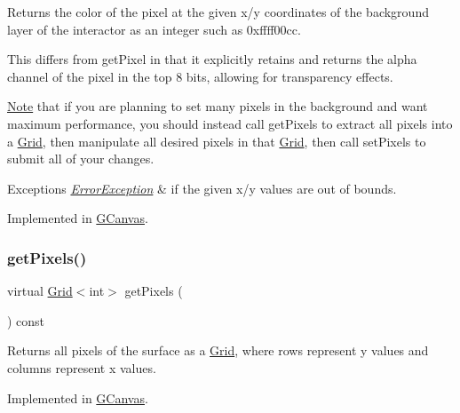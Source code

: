 Returns the color of the pixel at the given x/y coordinates of the background layer of the interactor as an integer such as 0xffff00cc. 

This differs from get\+Pixel in that it explicitly retains and returns the alpha channel of the pixel in the top 8 bits, allowing for transparency effects.

\mbox{\hyperlink{classNote}{Note}} that if you are planning to set many pixels in the background and want maximum performance, you should instead call get\+Pixels to extract all pixels into a \mbox{\hyperlink{classGrid}{Grid}}, then manipulate all desired pixels in that \mbox{\hyperlink{classGrid}{Grid}}, then call set\+Pixels to submit all of your changes.


\begin{DoxyExceptions}{Exceptions}
{\em \mbox{\hyperlink{classErrorException}{Error\+Exception}}} & if the given x/y values are out of bounds. \\
\hline
\end{DoxyExceptions}


Implemented in \mbox{\hyperlink{classGCanvas_ac1016456426446714a53d29da622f2ec}{G\+Canvas}}.

\mbox{\label{classGDrawingSurface_a9811240b1241922153dec17d395797cf}} 
\subsubsection{\texorpdfstring{get\+Pixels()}{getPixels()}}
{\footnotesize\ttfamily virtual \mbox{\hyperlink{classGrid}{Grid}}$<$int$>$ get\+Pixels (\begin{DoxyParamCaption}{ }\end{DoxyParamCaption}) const\hspace{0.3cm}{\ttfamily [pure virtual]}}



Returns all pixels of the surface as a \mbox{\hyperlink{classGrid}{Grid}}, where rows represent y values and columns represent x values. 



Implemented in \mbox{\hyperlink{classGCanvas_a430b4965720f3b35f10062a252883e75}{G\+Canvas}}.

\mbox{\label{classGDrawingSurface_a5712954f3edce2e1e4dd3109ffe16e05}} 
